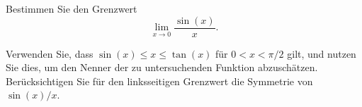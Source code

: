 \begin{ExerciseBlock}
Bestimmen Sie den Grenzwert
\begin{equation*}
	\lim_{x\rightarrow 0} \frac{\sin(x)}{x}.
\end{equation*}
\par\smallskip
Verwenden Sie, dass $\sin(x) \leq x \leq \tan(x)$ für $0<x<\pi/2$ gilt, und nutzen Sie dies, um den Nenner der zu untersuchenden Funktion abzuschätzen. Berücksichtigen Sie für den linksseitigen Grenzwert die Symmetrie von $\sin(x)/x$.

\begin{center}
\end{center}

\end{ExerciseBlock}
